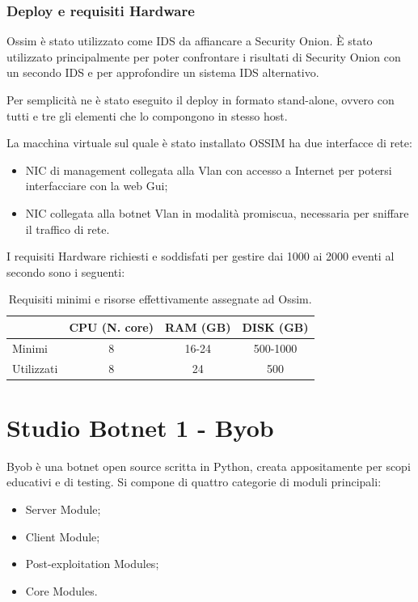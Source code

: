 \subsection*{Deploy e requisiti Hardware}

Ossim è stato utilizzato come IDS da affiancare a Security Onion. È stato utilizzato principalmente per poter confrontare i risultati di Security Onion con un secondo IDS e per approfondire un sistema  IDS alternativo.

Per semplicità ne è stato eseguito il deploy in formato stand-alone, ovvero con tutti e tre gli elementi che lo compongono in stesso host.

La macchina virtuale sul quale è stato installato OSSIM ha due interfacce di rete:
\begin{itemize}
    \item  NIC di management collegata alla Vlan con accesso a Internet per potersi interfacciare con la web Gui;
    \item  NIC collegata alla botnet Vlan in modalità promiscua, necessaria per sniffare il traffico di rete.
\end{itemize} 

I requisiti Hardware richiesti  e soddisfati per gestire dai 1000 ai 2000  eventi al secondo sono i seguenti:
\begin{table}[hbtp]
    \centering
    \begin{tabular}{|l|c|c|c|}
        \hline
        & CPU (N. core) & RAM (GB) & DISK (GB) \\
        \hline
        Minimi     & 8 & 16-24 & 500-1000   \\
        \hline
        Utilizzati &  8  & 24 & 500 \\
        \hline
    \end{tabular}
    \caption{Requisiti minimi e risorse effettivamente assegnate ad Ossim.}
    \label{tab:requisitiHw4}
\end{table}

\chapter{Studio Botnet 1 - Byob}
    

Byob \cite{byob} è una botnet open source scritta in Python, creata appositamente per scopi educativi e di testing.
Si compone di quattro categorie di moduli principali:
\begin{itemize}
    \item Server Module;
    \item Client Module;
    \item Post-exploitation Modules;
    \item Core Modules.
\end{itemize}

